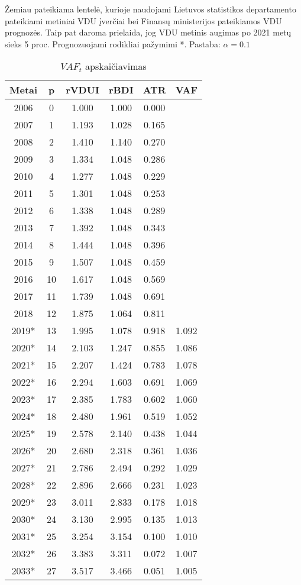 \documentclass[titlepage, 11pt]{article}
\begin{document}
Žemiau pateikiama lentelė, kurioje naudojami Lietuvos statistikos departamento pateikiami metiniai VDU įverčiai bei Finansų ministerijos pateikiamos VDU prognozės. Taip pat daroma prielaida, jog VDU metinis augimas po 2021 metų sieks 5 proc. Prognozuojami rodikliai pažymimi *. Pastaba: $\alpha=0.1$


\begin{table}[H]
\begin{center}
\begin{tabular}{|c|c|c|c|c|c|}
\hline
Metai & p  & rVDUI & rBDI  & ATR   & VAF   \\ \hline
2006 & 0 & 1.000 & 1.000 & 0.000 &  \\ \hline
2007 & 1 & 1.193 & 1.028 & 0.165 &  \\ \hline
2008 & 2 & 1.410 & 1.140 & 0.270 &  \\ \hline
2009 & 3 & 1.334 & 1.048 & 0.286 &  \\ \hline
2010 & 4 & 1.277 & 1.048 & 0.229 &  \\ \hline
2011 & 5 & 1.301 & 1.048 & 0.253 &  \\ \hline
2012 & 6 & 1.338 & 1.048 & 0.289 &  \\ \hline
2013 & 7 & 1.392 & 1.048 & 0.343 &  \\ \hline
2014 & 8 & 1.444 & 1.048 & 0.396 &  \\ \hline
2015 & 9 & 1.507 & 1.048 & 0.459 &  \\ \hline
2016 & 10 & 1.617 & 1.048 & 0.569 &  \\ \hline
2017 & 11 & 1.739 & 1.048 & 0.691 &  \\ \hline
2018 & 12 & 1.875 & 1.064 & 0.811 &  \\ \hline
2019* & 13 & 1.995 & 1.078 & 0.918 & 1.092 \\ \hline
2020* & 14 & 2.103 & 1.247 & 0.855 & 1.086 \\ \hline
2021* & 15 & 2.207 & 1.424 & 0.783 & 1.078 \\ \hline
2022* & 16 & 2.294 & 1.603 & 0.691 & 1.069 \\ \hline
2023* & 17 & 2.385 & 1.783 & 0.602 & 1.060 \\ \hline
2024* & 18 & 2.480 & 1.961 & 0.519 & 1.052 \\ \hline
2025* & 19 & 2.578 & 2.140 & 0.438 & 1.044 \\ \hline
2026* & 20 & 2.680 & 2.318 & 0.361 & 1.036 \\ \hline
2027* & 21 & 2.786 & 2.494 & 0.292 & 1.029 \\ \hline
2028* & 22 & 2.896 & 2.666 & 0.231 & 1.023 \\ \hline
2029* & 23 & 3.011 & 2.833 & 0.178 & 1.018 \\ \hline
2030* & 24 & 3.130 & 2.995 & 0.135 & 1.013 \\ \hline
2031* & 25 & 3.254 & 3.154 & 0.100 & 1.010 \\ \hline
2032* & 26 & 3.383 & 3.311 & 0.072 & 1.007 \\ \hline
2033* & 27 & 3.517 & 3.466 & 0.051 & 1.005 \\ \hline
\end{tabular}
\caption{$VAF_t$ apskaičiavimas}
\end{center}
\end{table}
\end{document}

